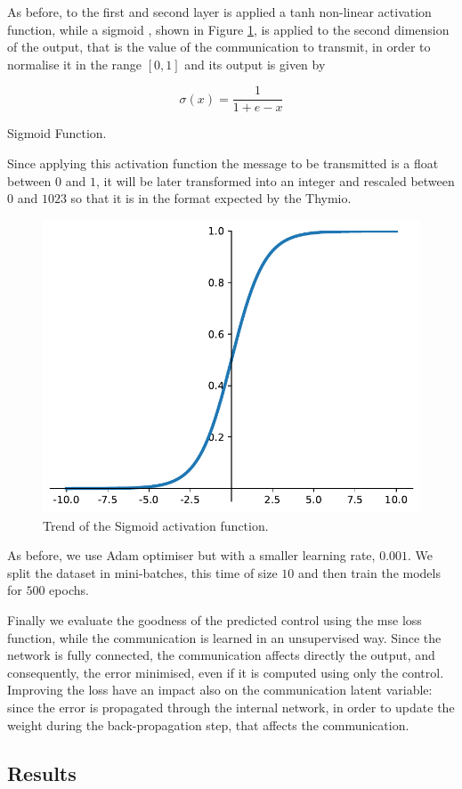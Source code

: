 As before, to the first and second layer is applied a tanh non-linear activation 
function, while a sigmoid \cite[see][]{han1995influence}, shown in Figure 
\ref{fig:sigmoid}, is applied to the second dimension of the output, that is the 
value of the communication to transmit, in order to normalise it in the range $[0, 
1]$ and its output is given by
\begin{Equation}[htb]
	\centering
	\begin{equation}
	\sigma(x)= \frac{1}{1 + e - x}
	\end{equation}
	\caption{Sigmoid Function.}
	\label{eq:sigmoid}
\end{Equation}

\noindent
Since applying this activation function the message to be transmitted is a float 
between $0$ and $1$, it will be later transformed into an integer and rescaled 
between $0$ and $1023$ so that it is in the format expected by the Thymio.

\begin{figure}[htb]
	\centering
	\includegraphics[width=.5\textwidth]{contents/images/sigmoid2}%
	\caption{Trend of the Sigmoid activation function.}
	\label{fig:sigmoid}
\end{figure}

As before, we use Adam optimiser but with a smaller learning rate, $0.001$. We 
split the dataset in mini-batches, this time of size $10$ and then train the models 
for $500$ epochs. 

Finally we evaluate the goodness of the predicted control using the \gls{mse} loss 
function, while the communication is learned in an unsupervised way.
Since the network is fully connected, the communication affects directly the 
output, and consequently, the error minimised, even if it is computed using only 
the control. Improving the loss have an impact also on the communication latent 
variable: since the error is propagated through the internal network, in order to 
update the weight during the back-propagation step, that affects the 
communication.

\subsection{Results}
\label{subsec:results1}

